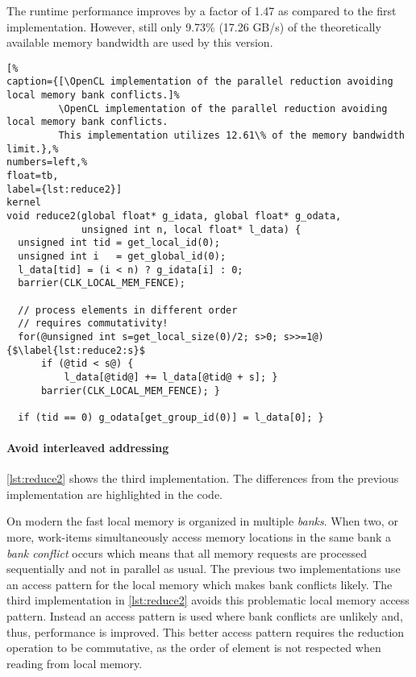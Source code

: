 The runtime performance improves by a factor of 1.47 as compared to the first implementation.
However, still only 9.73\% (17.26 GB/s) of the theoretically available memory bandwidth are used by this version.


\FloatBarrier
\begin{lstlisting}[%
caption={[\OpenCL implementation of the parallel reduction avoiding local memory bank conflicts.]%
         \OpenCL implementation of the parallel reduction avoiding local memory bank conflicts.
         This implementation utilizes 12.61\% of the memory bandwidth limit.},%
numbers=left,%
float=tb,
label={lst:reduce2}]
kernel
void reduce2(global float* g_idata, global float* g_odata,
             unsigned int n, local float* l_data) {
  unsigned int tid = get_local_id(0);
  unsigned int i   = get_global_id(0);
  l_data[tid] = (i < n) ? g_idata[i] : 0;
  barrier(CLK_LOCAL_MEM_FENCE);

  // process elements in different order
  // requires commutativity!
  for(@unsigned int s=get_local_size(0)/2; s>0; s>>=1@) {$\label{lst:reduce2:s}$
      if (@tid < s@) {
          l_data[@tid@] += l_data[@tid@ + s]; }
      barrier(CLK_LOCAL_MEM_FENCE); }

  if (tid == 0) g_odata[get_group_id(0)] = l_data[0]; }
\end{lstlisting}

\paragraph{Avoid interleaved addressing}

\autoref{lst:reduce2} shows the third implementation.
The differences from the previous implementation are highlighted in the code.

On modern \GPUs the fast local memory is organized in multiple \emph{banks}.
When two, or more, work-items simultaneously access memory locations in the same bank a \emph{bank conflict} occurs which means that all memory requests are processed sequentially and not in parallel as usual.
The previous two implementations use an access pattern for the local memory which makes bank conflicts likely.
The third implementation in \autoref{lst:reduce2} avoids this problematic local memory access pattern.
Instead an access pattern is used where bank conflicts are unlikely and, thus, performance is improved.
This better access pattern requires the reduction operation to be commutative, as the order of element is not respected when reading from local memory.

